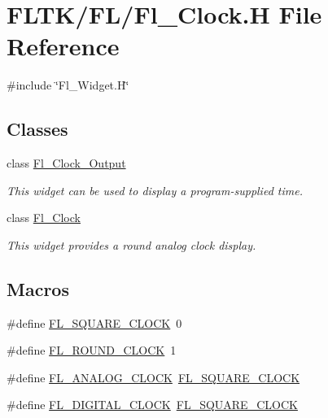 \hypertarget{_fl___clock_8_h}{}\section{F\+L\+T\+K/\+F\+L/\+Fl\+\_\+\+Clock.H File Reference}
\label{_fl___clock_8_h}
{\ttfamily \#include \char`\"{}Fl\+\_\+\+Widget.\+H\char`\"{}}\newline
\subsection*{Classes}
\begin{DoxyCompactItemize}
\item 
class \hyperlink{class_fl___clock___output}{Fl\+\_\+\+Clock\+\_\+\+Output}
\begin{DoxyCompactList}\small\item\em This widget can be used to display a program-\/supplied time. \end{DoxyCompactList}\item 
class \hyperlink{class_fl___clock}{Fl\+\_\+\+Clock}
\begin{DoxyCompactList}\small\item\em This widget provides a round analog clock display. \end{DoxyCompactList}\end{DoxyCompactItemize}
\subsection*{Macros}
\begin{DoxyCompactItemize}
\item 
\#define \hyperlink{_fl___clock_8_h_a44aec6c74a10e0ed51229d815903e53c}{F\+L\+\_\+\+S\+Q\+U\+A\+R\+E\+\_\+\+C\+L\+O\+CK}~0
\item 
\#define \hyperlink{_fl___clock_8_h_a093fb814b7c130d94e5c7e06c5c0a047}{F\+L\+\_\+\+R\+O\+U\+N\+D\+\_\+\+C\+L\+O\+CK}~1
\item 
\#define \hyperlink{_fl___clock_8_h_a4a17f6bb17c9908a67d8372f16191cdb}{F\+L\+\_\+\+A\+N\+A\+L\+O\+G\+\_\+\+C\+L\+O\+CK}~\hyperlink{_fl___clock_8_h_a44aec6c74a10e0ed51229d815903e53c}{F\+L\+\_\+\+S\+Q\+U\+A\+R\+E\+\_\+\+C\+L\+O\+CK}
\item 
\#define \hyperlink{_fl___clock_8_h_ada10329fbebcdc0b5931dd0a7eb80249}{F\+L\+\_\+\+D\+I\+G\+I\+T\+A\+L\+\_\+\+C\+L\+O\+CK}~\hyperlink{_fl___clock_8_h_a44aec6c74a10e0ed51229d815903e53c}{F\+L\+\_\+\+S\+Q\+U\+A\+R\+E\+\_\+\+C\+L\+O\+CK}
\end{DoxyCompactItemize}



